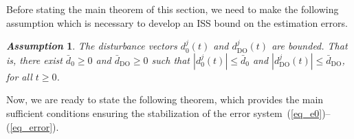 \documentclass{ifacconf}
\def\eqref#1{(\ref{#1})}
\newtheorem{assumption}{\it \textbf{Assumption}}%
\begin{document}
%
Before stating the main theorem of this section, we need to make the following assumption which is necessary to develop an ISS bound on the estimation errors.
\begin{assumption}\label{assum_distur}
The disturbance vectors $d^j_{0}(t)$ and $d^j_{\mathrm{DO}}(t)$ are bounded. That is, there exist $\bar{d}_{0} \geq 0$ and $\bar{d}_{\mathrm{DO}} \geq 0$ such that
$|d^j_{0}(t)| \le \bar{d}_{0}$  and
$| d^j_{\mathrm{DO}}(t) | \le \bar{d}_{\mathrm{DO}}$, for all $t\geq 0$.
\end{assumption}

Now, we are ready to state the following theorem, which provides the main sufficient conditions ensuring the stabilization of the error system~\eqref{eq_e0}--\eqref{eq_error}.
\end{document}
